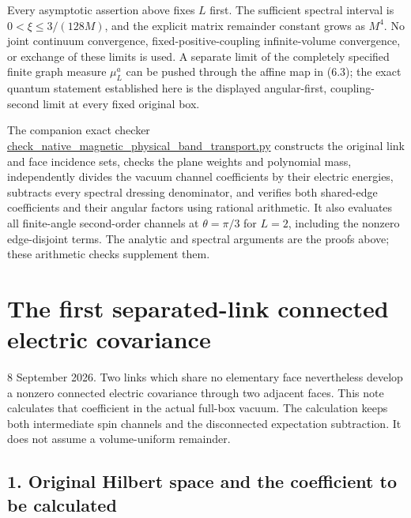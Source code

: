 \documentclass[
  11pt,
]{article}
\begin{document}
Every asymptotic assertion above fixes \(L\) first. The sufficient
spectral interval is \(0<\xi\le3/(128M)\), and the explicit matrix
remainder constant grows as \(M^4\). No joint continuum convergence,
fixed-positive-coupling infinite-volume convergence, or exchange of
these limits is used. A separate limit of the completely specified
finite graph measure \(\mu_L^a\) can be pushed through the affine map in
(6.3); the exact quantum statement established here is the displayed
angular-first, coupling-second limit at every fixed original box.

The companion exact checker
\url{check_native_magnetic_physical_band_transport.py} constructs the
original link and face incidence sets, checks the plane weights and
polynomial mass, independently divides the vacuum channel coefficients
by their electric energies, subtracts every spectral dressing
denominator, and verifies both shared-edge coefficients and their
angular factors using rational arithmetic. It also evaluates all
finite-angle second-order channels at \(\theta=\pi/3\) for \(L=2\),
including the nonzero edge-disjoint terms. The analytic and spectral
arguments are the proofs above; these arithmetic checks supplement them.

\clearpage
\section{The first separated-link connected electric
covariance}\label{magnetic-part-10-the-first-separated-link-connected-electric-covariance}

8 September 2026. Two links which share no elementary face nevertheless
develop a nonzero connected electric covariance through two adjacent
faces. This note calculates that coefficient in the actual full-box
vacuum. The calculation keeps both intermediate spin channels and the
disconnected expectation subtraction. It does not assume a
volume-uniform remainder.

\subsection{1. Original Hilbert space and the coefficient to be
calculated}\label{magnetic-part-10-original-hilbert-space-and-the-coefficient-to-be-calculated}
\end{document}
